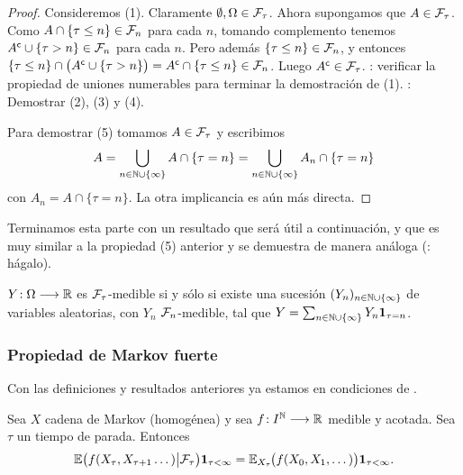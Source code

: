\begin{proof}
Consideremos (1).
Claramente $\emptyset,\Omega\in\mathcal{F}_\tau$.
Ahora supongamos que $A\in\mathcal{F}_\tau$.
Como $A\cap\{\tau\leq n\}\in\mathcal{F}_n$ para cada $n$, tomando complemento tenemos $A^{\sf c}\cup\{\tau>n\}\in\mathcal{F}_n$ para cada $n$.
Pero además $\{\tau\leq n\}\in\mathcal{F}_n$, y entonces $\{\tau\leq n\}\cap\big(A^{\sf c}\cup\{\tau>n\}\big)=A^{\sf c}\cap\{\tau\leq n\}\in\mathcal{F}_n$.
Luego $A^{\sf c}\in\mathcal{F}_\tau$.
\uexer: verificar la propiedad de uniones numerables para terminar la demostración de (1).
\uexer: Demostrar (2), (3) y (4).

Para demostrar (5) tomamos $A\in\mathcal{F}_\tau$ y escribimos
\[A=\bigcup_{n\in\mathbb{N}\cup\{\infty\}}A\cap\{\tau=n\}=\bigcup_{n\in\mathbb{N}\cup\{\infty\}}A_n\cap\{\tau=n\}\]
con $A_n=A\cap\{\tau=n\}$.
La otra implicancia es aún más directa.
\end{proof}

Terminamos esta parte con un resultado que será útil a continuación, y que es muy similar a la propiedad (5) anterior y se demuestra de manera análoga (\uexers: hágalo).

\begin{lem}\label{lem:Ymed}
$Y\!:\Omega\longrightarrow\mathbb{R}$ es $\mathcal{F}_\tau$-medible si y sólo si existe una sucesión $(Y_n)_{n\in\mathbb{N}\cup\{\infty\}}$ de variables aleatorias, con $Y_n$ $\mathcal{F}_n$-medible, tal que $Y=\sum_{n\in\mathbb{N}\cup\{\infty\}}Y_n\mathbf{1}_{\tau=n}$.
\end{lem}

\subsubsection{Propiedad de Markov fuerte}

Con las definiciones y resultados anteriores ya estamos en condiciones de .

\begin{thm}
Sea $X$ cadena de Markov (homogénea) y sea $f\!:I^{\mathbb{N}}\longrightarrow\mathbb{R}$ medible y acotada.
Sea $\tau$ un tiempo de parada.
Entonces
\begin{equation}
\mathbb{E}\big(f(X_{\tau},X_{\tau+1}\dotsc)\big|\mathcal{F}_\tau\big)\mathbf{1}_{\tau<\infty}=\mathbb{E}_{X_\tau}\hspace{-0.1em}\big(f(X_0,X_1,\dotsc)\big)\mathbf{1}_{\tau<\infty}.\label{eq:propMarkF}
\end{equation}
\end{thm}

